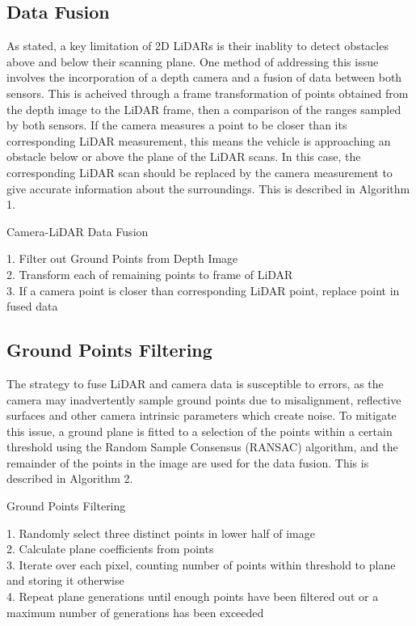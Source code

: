 \documentclass[conference]{IEEEtran}
\begin{document}
\subsection{Data Fusion}
As stated, a key limitation of 2D LiDARs is their inablity to detect obstacles above and below their scanning plane. One method of addressing this issue involves the incorporation of a depth camera and a fusion of data between both sensors. This is acheived through a frame transformation of points obtained from the depth image to the LiDAR frame, then a comparison of the ranges sampled by both sensors. If the camera measures a point to be closer than its corresponding LiDAR measurement, this means the vehicle is approaching an obstacle below or above the plane of the LiDAR scans. In this case, the corresponding LiDAR scan should be replaced by the camera measurement to give accurate information about the surroundings. This is described in Algorithm 1.

\begin{algorithm}
\caption{Camera-LiDAR Data Fusion}

        1. Filter out Ground Points from Depth Image\\
        2. Transform each of remaining points to frame of LiDAR\\
        3. If a camera point is closer than corresponding LiDAR point,   replace point in fused data \\

\end{algorithm}

\subsection{Ground Points Filtering}


The strategy to fuse LiDAR and camera data is susceptible to errors, as the camera may inadvertently sample ground points due to misalignment, reflective surfaces and other camera intrinsic parameters which create noise. To mitigate this issue, a ground plane is fitted to a selection of the points within a certain threshold using the Random Sample Consensus (RANSAC) algorithm, and the remainder of the points in the image are used for the data fusion. This is described in Algorithm 2.


\begin{algorithm}
\caption{Ground Points Filtering}

        1. Randomly select three distinct points in lower half of image\\
        2. Calculate plane coefficients from points\\
        3. Iterate over each pixel, counting number of points within threshold to plane and storing it otherwise \\
        4. Repeat plane generations until enough points have been filtered out or a maximum number of generations has been exceeded \\

\end{algorithm}
\end{document}
